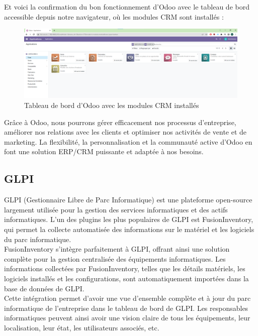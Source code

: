 Et voici la confirmation du bon fonctionnement d'Odoo avec le tableau de bord accessible depuis notre navigateur, où les modules CRM sont installés : \\

\begin{figure}[H]
 \centering
    \includegraphics[width=15cm]{Images/OdooServer2.png}
    \caption{Tableau de bord d'Odoo avec les modules CRM installés}
    \label{fig:odoo-dashboard}
\end{figure}

Grâce à Odoo, nous pourrons gérer efficacement nos processus d'entreprise, améliorer nos relations avec les clients et optimiser nos activités de vente et de marketing. La flexibilité, la personnalisation et la communauté active d'Odoo en font une solution ERP/CRM puissante et adaptée à nos besoins. \\



\subsection{GLPI}
GLPI (Gestionnaire Libre de Parc Informatique) est une plateforme open-source largement utilisée pour la gestion des services informatiques et des actifs informatiques. L'un des plugins les plus populaires de GLPI est FusionInventory, qui permet la collecte automatisée des informations sur le matériel et les logiciels du parc informatique. \\

FusionInventory s'intègre parfaitement à GLPI, offrant ainsi une solution complète pour la gestion centralisée des équipements informatiques. Les informations collectées par FusionInventory, telles que les détails matériels, les logiciels installés et les configurations, sont automatiquement importées dans la base de données de GLPI. \\

Cette intégration permet d'avoir une vue d'ensemble complète et à jour du parc informatique de l'entreprise dans le tableau de bord de GLPI. Les responsables informatiques peuvent ainsi avoir une vision claire de tous les équipements, leur localisation, leur état, les utilisateurs associés, etc. \\

